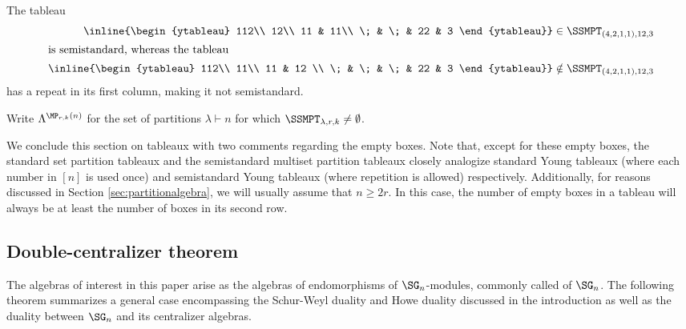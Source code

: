 \begin{exam} The tableau
    \begin{align*}
        \inline{\begin{ytableau}
        112\\
        12\\
        11 & 11\\
        \; & \; & 22 & 3
\end{ytableau}}&\in \SSMPT_{(4,2,1,1),12,3}\\
        \intertext{is semistandard, whereas the tableau}
        \inline{\begin{ytableau}
        112\\
        11\\
        11 & 12 \\
        \; & \; & \; & 22 & 3
\end{ytableau}}&\notin \SSMPT_{(4,2,1,1),12,3}
    \end{align*} has a repeat in its first column, making it not semistandard.
\end{exam}

Write $\Lambda^{\MP_{r,k}(n)}$ for the set of partitions $\lambda\vdash n$ for which $\SSMPT_{\lambda,r,k}\neq\emptyset$. 

\begin{rema} We conclude this section on tableaux with two comments regarding the empty boxes. Note that, except for these empty boxes, the standard set partition tableaux and the semistandard multiset partition tableaux closely analogize standard Young tableaux (where each number in $[n]$ is used once) and semistandard Young tableaux (where repetition is allowed) respectively. Additionally, for reasons discussed in Section \ref{sec:partitionalgebra}, we will usually assume that $n\geq2r$. In this case, the number of empty boxes in a tableau will always be at least the number of boxes in its second row.
\end{rema}

\subsection{Double-centralizer theorem}

The algebras of interest in this paper arise as the algebras of endomorphisms of $\SG_n$-modules, commonly called  of $\SG_n$. The following theorem summarizes a general case encompassing the Schur-Weyl duality and Howe duality discussed in the introduction as well as the duality between $\SG_n$ and its centralizer algebras.


